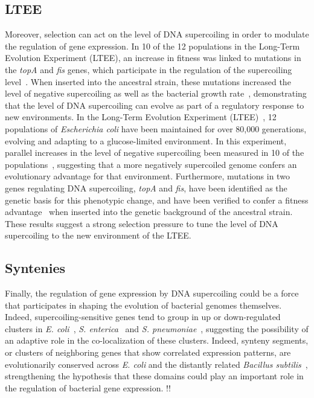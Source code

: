 \subsection{LTEE}

Moreover, selection can act on the level of DNA supercoiling in order to modulate the regulation of gene expression.
In 10 of the 12 populations in the Long-Term Evolution Experiment (LTEE), an increase in fitness was linked to mutations in the \emph{topA} and \emph{fis} genes, which participate in the regulation of the supercoiling level~\citep{crozat2010}.
When inserted into the ancestral strain, these mutations increased the level of negative supercoiling as well as the bacterial growth rate~\citep{crozat2005}, demonstrating that the level of DNA supercoiling can evolve as part of a regulatory response to new environments.
In the Long-Term Evolution Experiment (LTEE)~\citep{lenski1991}, 12 populations of \emph{Escherichia coli} have been maintained for over 80,000 generations, evolving and adapting to a glucose-limited environment.
In this experiment, parallel increases in the level of negative supercoiling been measured in 10 of the populations~\citep{crozat2010}, suggesting that a more negatively supercoiled genome confers an evolutionary advantage for that environment.
Furthermore, mutations in two genes regulating DNA supercoiling, \emph{topA} and \emph{fis}, have been identified as the genetic basis for this phenotypic change, and have been verified to confer a fitness advantage~\citep{crozat2005} when inserted into the genetic background of the ancestral strain.
These results suggest a strong selection pressure to tune the level of DNA supercoiling to the new environment of the LTEE.

\subsection{Syntenies}
Finally, the regulation of gene expression by DNA supercoiling could be a force that participates in shaping the evolution of bacterial genomes themselves.
Indeed, supercoiling-sensitive genes tend to group in up or down-regulated clusters in \emph{E. coli}~\citep{peter2004}, \emph{S. enterica}~\citep{webber2013} and \emph{S. pneumoniae}~\citep{ferrandiz2010}, suggesting the possibility of an adaptive role in the co-localization of these clusters.
Indeed, synteny segments, or clusters of neighboring genes that show correlated expression patterns, are evolutionarily conserved across \emph{E. coli} and the distantly related \emph{Bacillus subtilis}~\citep{junier2016}, strengthening the hypothesis that these domains could play an important role in the regulation of bacterial gene expression.
\citep{sobetzko2016}!!

